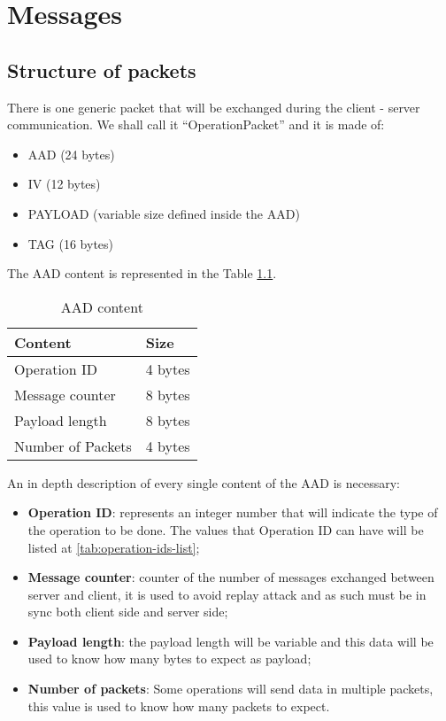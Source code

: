 
\chapter{Messages}
\label{cap:messages}

\section{Structure of packets}

There is one generic packet that will be exchanged during the client - server communication. We shall call it ``OperationPacket'' and it is made of: \newline{}
\begin{itemize}
	\item AAD (24 bytes)
	\item IV (12 bytes)
	\item PAYLOAD (variable size defined inside the AAD)
	\item TAG (16 bytes)
\end{itemize}
The AAD content is represented in the Table \ref{tab:AAD-content}.
\begin{longtable}{|p{}|p{}|}
	\caption{AAD content}
	\label{AAD content} 
	\label{tab:AAD-content} \\
	\hline
	\textbf{Content} & \textbf{Size} \\
	\hline
	Operation ID & 4 bytes \\
	\hline
	Message counter & 8 bytes \\
	\hline
	Payload length & 8 bytes \\
	\hline
	Number of Packets & 4 bytes \\
	\hline
\end{longtable}%

An in depth description of every single content of the AAD is necessary:

\begin{itemize}
	\item \textbf{Operation ID}: represents an integer number that will indicate the type of the operation to be done. The values that Operation ID can have will be listed at \ref{tab:operation-ids-list};
	\item \textbf{Message counter}: counter of the number of messages exchanged between server and client, it is used to avoid replay attack and as such must be in sync both client side and server side;
	\item \textbf{Payload length}: the payload length will be variable and this data will be used to know how many bytes to expect as payload;
	\item \textbf{Number of packets}: Some operations will send data in multiple packets, this value is used to know how many packets to expect.
\end{itemize}

